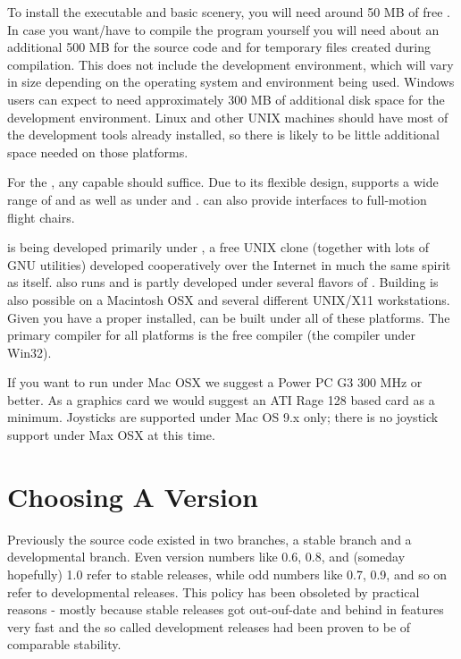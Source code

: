 To install the executable and basic scenery, you will need around 50 MB of free . In case you want/have to compile the program yourself you will need about an additional
500 MB for the source code and for temporary files created during compilation. This does not
include the development environment, which will vary in size depending on the operating system
and environment being used.  Windows users can expect to need approximately 300 MB of additional
disk space for the development environment.  Linux and other UNIX machines should have most of
the development tools already installed, so there is likely to be little additional space
needed on those platforms.

For the , any capable  should suffice.
Due to its flexible design, \FlightGear{} supports a wide range of  and
 as well as  under  and . 
\FlightGear{} can also provide interfaces to full-motion flight chairs.

\FlightGear{} is being developed primarily under , a free UNIX clone
(together with lots of GNU utilities) developed cooperatively over the Internet in much
the same spirit as \FlightGear{} itself. \FlightGear{} also runs and is partly developed
under several flavors of . Building \FlightGear{} is also possible on a Macintosh OSX
and several different UNIX/X11 workstations. Given you have a proper  installed,
\FlightGear{} can be built under all of these platforms. The primary compiler for all platforms is
the free  compiler (the   compiler under Win32).

If you want to run \FlightGear{} under Mac OSX we suggest a Power PC G3 300 MHz or better. As a
graphics card we would suggest an ATI Rage 128 based card as a minimum. Joysticks are supported
under Mac OS 9.x only; there is no joystick support under Max OSX at this time.


\section{Choosing A Version}

Previously the \FlightGear{} source code existed in two branches, a
stable branch and a developmental branch. Even version numbers like 0.6,
0.8, and (someday hopefully) 1.0 refer to stable releases, while odd
numbers like 0.7, 0.9, and so on refer to developmental releases.
This policy has been obsoleted by practical reasons - mostly because
stable releases got out-ouf-date and behind in features very fast and
the so called development releases had been proven to be of comparable
stability.\label{branches}

